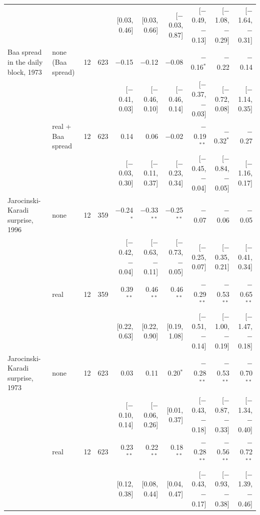 \begin{table}[tp]
{\begin{tabular}{llcrrrrrrr}
 & & & & {\scriptsize [0.03, 0.46]} & {\scriptsize [0.03, 0.66]} & {\scriptsize [$-$0.03, 0.87]} & {\scriptsize [$-$0.49, $-$0.13]} & {\scriptsize [$-$1.08, $-$0.29]} & {\scriptsize [$-$1.64, $-$0.31]}\\
\addlinespace
Baa spread in the daily block, 1973 & none (Baa spread) & 12 & 623 & $-$0.15 & $-$0.12 & $-$0.08 & $-$0.16$^{*}$ & $-$0.22 & $-$0.14\\
 & & & & {\scriptsize [$-$0.41, 0.03]} & {\scriptsize [$-$0.46, 0.10]} & {\scriptsize [$-$0.46, 0.14]} & {\scriptsize [$-$0.37, $-$0.03]} & {\scriptsize [$-$0.72, 0.08]} & {\scriptsize [$-$1.14, 0.35]}\\
 & real + Baa spread & 12 & 623 & 0.14 & 0.06 & $-$0.02 & $-$0.19$^{**}$ & $-$0.32$^{*}$ & $-$0.27\\
 & & & & {\scriptsize [$-$0.03, 0.30]} & {\scriptsize [$-$0.11, 0.37]} & {\scriptsize [$-$0.23, 0.34]} & {\scriptsize [$-$0.45, $-$0.04]} & {\scriptsize [$-$0.84, $-$0.05]} & {\scriptsize [$-$1.16, 0.17]}\\
\addlinespace
Jarocinski-Karadi surprise, 1996 & none & 12 & 359 & $-$0.24$^{*}$ & $-$0.33$^{**}$ & $-$0.25$^{**}$ & $-$0.07 & $-$0.06 & $-$0.05\\
 & & & & {\scriptsize [$-$0.42, $-$0.04]} & {\scriptsize [$-$0.63, $-$0.11]} & {\scriptsize [$-$0.73, $-$0.05]} & {\scriptsize [$-$0.25, 0.07]} & {\scriptsize [$-$0.35, 0.21]} & {\scriptsize [$-$0.41, 0.34]}\\
 & real & 12 & 359 & 0.39$^{**}$ & 0.46$^{**}$ & 0.46$^{**}$ & $-$0.29$^{**}$ & $-$0.53$^{**}$ & $-$0.65$^{**}$\\
 & & & & {\scriptsize [0.22, 0.63]} & {\scriptsize [0.22, 0.90]} & {\scriptsize [0.19, 1.08]} & {\scriptsize [$-$0.51, $-$0.14]} & {\scriptsize [$-$1.00, $-$0.19]} & {\scriptsize [$-$1.47, $-$0.18]}\\
\addlinespace
Jarocinski-Karadi surprise, 1973 & none & 12 & 623 & 0.03 & 0.11 & 0.20$^{*}$ & $-$0.28$^{**}$ & $-$0.53$^{**}$ & $-$0.70$^{**}$\\
 & & & & {\scriptsize [$-$0.10, 0.14]} & {\scriptsize [$-$0.06, 0.26]} & {\scriptsize [0.01, 0.37]} & {\scriptsize [$-$0.43, $-$0.18]} & {\scriptsize [$-$0.87, $-$0.33]} & {\scriptsize [$-$1.34, $-$0.40]}\\
 & real & 12 & 623 & 0.23$^{**}$ & 0.22$^{**}$ & 0.18$^{**}$ & $-$0.28$^{**}$ & $-$0.56$^{**}$ & $-$0.72$^{**}$\\
 & & & & {\scriptsize [0.12, 0.38]} & {\scriptsize [0.08, 0.44]} & {\scriptsize [0.04, 0.47]} & {\scriptsize [$-$0.43, $-$0.17]} & {\scriptsize [$-$0.93, $-$0.38]} & {\scriptsize [$-$1.39, $-$0.46]}\\

\end{tabular}}
\end{table}

